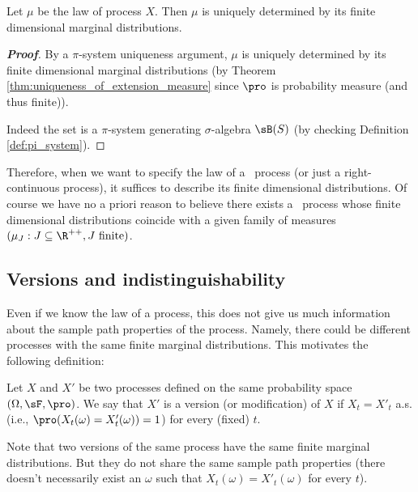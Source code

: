 \begin{proposition}\label{pro:process_law_is_uniquely_determined_by_its_finite_dimensional_marginal_distribution}
Let $\mu$ be the law of process $X$. Then $\mu$ is uniquely determined by its finite dimensional marginal distributions.
\end{proposition}

\begin{proof}[\bf Proof]
By a $\pi$-system uniqueness argument, $\mu$ is uniquely determined by its finite dimensional marginal distributions (by Theorem \ref{thm:uniqueness_of_extension_measure} since $\pro$ is probability measure (and thus finite)).

Indeed the set
\be
{}
\ee
is a $\pi$-system generating $\sigma$-algebra $\sB(S)$ (by checking Definition \ref{def:pi_system}).
\end{proof}

Therefore, when we want to specify the law of a \cadlag\ process (or just a right-continuous process), it suffices to describe its finite dimensional distributions. Of course we have no a priori reason to believe there exists a \cadlag\ process whose finite dimensional distributions coincide with a given family of measures $(\mu_J : J \subseteq \R^{++}, J\text{ finite})$.

\subsection{Versions and indistinguishability}

Even if we know the law of a process, this does not give us much information about the sample path properties of the process. Namely, there could be different processes with the same finite marginal distributions. This motivates the following definition:

\begin{definition}\label{def:version_process}
Let $X$ and $X'$ be two processes defined on the same probability space $(\Omega,\sF,\pro)$. We say that $X'$ is a version (or modification) of $X$ if $X_t = X'_t$ a.s. (i.e., $\pro(X_t(\omega) = X'_t(\omega)) = 1$) for every (fixed) $t$.
\end{definition}

\begin{remark}
Note that two versions of the same process have the same finite marginal distributions. But they do not share the same sample path properties (there doesn't necessarily exist an $\omega$ such that $X_t(\omega) = X'_t(\omega)$ for every $t$).
\end{remark}

